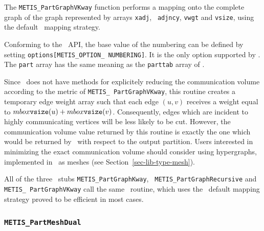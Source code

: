 \begin{itemize}
\progdes

The {\tt METIS\_PartGraphVKway} function performs a mapping onto the
complete graph of the graph represented by arrays {\tt xadj}, {\tt
adjncy}, {\tt vwgt} and {\tt vsize}, using the default
\scotch\ mapping strategy.

Conforming to the \metis\ API, the base value of the numbering
can be defined by setting \texttt{options[METIS\_\lbt OPTION\_\lbt
NUMBERING]}. It is the only option supported by \scotch.
The {\tt part} array has the same meaning as the {\tt parttab} array
of \scotch.

Since \scotch\ does not have methods for explicitely reducing the
communication volume according to the metric of {\tt METIS\_\lbo
Part\lbo Graph\lbo VKway}, this routine creates a temporary
edge weight array such that each edge $(u,v)$ receives a weight
equal to $mbox{\tt vsize}(u) + mbox{\tt vsize}(v)$. Consequently,
edges which are incident to highly communicating vertices will be
less likely to be cut. However, the communication volume value
returned by this routine is exactly the one which would be returned
by \metis\ with respect to the output partition. Users interested
in minimizing the exact communication volume should consider using
hypergraphs, implemented in \scotch\ as
meshes (see Section~\ref{sec-lib-type-mesh}).

All of the three \metis\ stubs
{\tt METIS\_\lbo Part\lbo Graph\lbo Kway}, {\tt
METIS\_\lbo Part\lbo Graph\lbo Recursive} and {\tt METIS\_\lbo
Part\lbo Graph\lbo VKway} call the same \scotch\ routine, which uses
the \scotch\ default mapping strategy proved to be efficient in most
cases.
\end{itemize}

\subsubsection{{\tt METIS\_PartMeshDual}}

